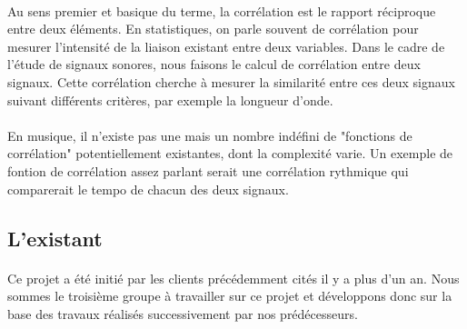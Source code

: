 \paragraph{}
Au sens premier et basique du terme, la corrélation est le rapport
réciproque entre deux éléments. En statistiques, on parle souvent de
corrélation pour mesurer l'intensité de la liaison existant entre deux
variables.
Dans le cadre de l'étude de signaux sonores, nous faisons le calcul de
corrélation entre deux signaux. Cette corrélation cherche à mesurer
la similarité entre ces deux signaux suivant
différents critères, par exemple la longueur d'onde.
\paragraph{}
En musique, il n'existe pas une mais un nombre indéfini de "fonctions
de corrélation" potentiellement existantes, dont la complexité
varie.
Un exemple de fontion de corrélation assez parlant serait une corrélation
rythmique qui comparerait le tempo de chacun des deux signaux.




\subsection{L'existant}
\paragraph{}
Ce projet a été initié par les clients précédemment cités il y a plus
d'un an. Nous sommes le troisième groupe à travailler sur ce projet et
développons donc sur la base des travaux réalisés successivement par
nos prédécesseurs.

